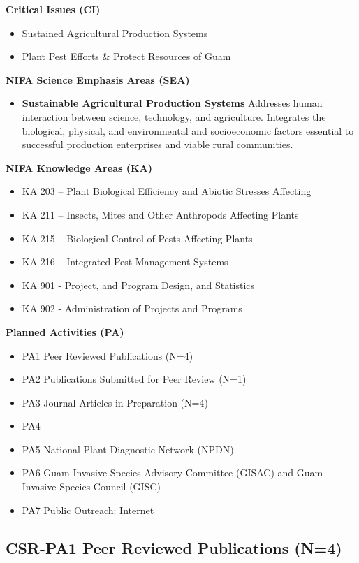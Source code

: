 \textbf{Critical Issues (CI)}
\begin{itemize}
	\item Sustained Agricultural Production Systems
	\item Plant Pest Efforts \& Protect Resources of Guam
\end{itemize}

\textbf{NIFA Science Emphasis Areas (SEA)}
\begin{itemize}
	\item \textbf{Sustainable Agricultural Production Systems} Addresses human interaction between science, technology, and agriculture. Integrates the biological, physical, and environmental and socioeconomic factors essential to successful production enterprises and viable rural communities. 
\end{itemize}

\textbf{NIFA Knowledge Areas (KA)}
\begin{itemize}
	\item KA 203 – Plant Biological Efficiency and Abiotic Stresses Affecting
	\item KA 211 – Insects, Mites and Other Anthropods Affecting Plants
	\item KA 215 – Biological Control of Pests Affecting Plants
	\item KA 216 – Integrated Pest Management Systems
	\item KA 901 - Project, and Program Design, and Statistics
	\item KA 902 - Administration of Projects and Programs
\end{itemize}

\textbf{Planned Activities (PA)}
\begin{itemize}
	\item PA1 Peer Reviewed Publications (N=4)
	\item PA2 Publications Submitted for Peer Review (N=1)
	\item PA3 Journal Articles in Preparation (N=4)
	\item PA4 
	\item PA5 National Plant Diagnostic Network (NPDN)
	\item PA6 Guam Invasive Species Advisory Committee (GISAC) and Guam Invasive Species Council (GISC)
	\item PA7 Public Outreach: Internet
\end{itemize}


\subsection{CSR-PA1 Peer Reviewed Publications (N=4)}
	\begin{refsection}
		\nocite{siderhurst_effects_2021, barrera_electron_2021, marshall_production_2021, cave_biological_2022}
		\printbibliography[heading=none]	
	\end{refsection}
